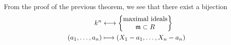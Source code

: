 \begin{corollary}\label{corollary : maximal ideals in k[x1,...,xn] ring characterization}
    From the proof of the previous theorem, we see that there exist a bijection 
    \begin{equation}
        \begin{split}
            k^n &\longleftrightarrow \left\{\begin{matrix}\text{maximal ideals}\\\mathfrak{m}\subset R\end{matrix}\right\}\\
           (a_1,\dots,a_n)&\longmapsto (X_1-a_1,\dots, X_n-a_n)
        \end{split}
    \end{equation}
\end{corollary}


